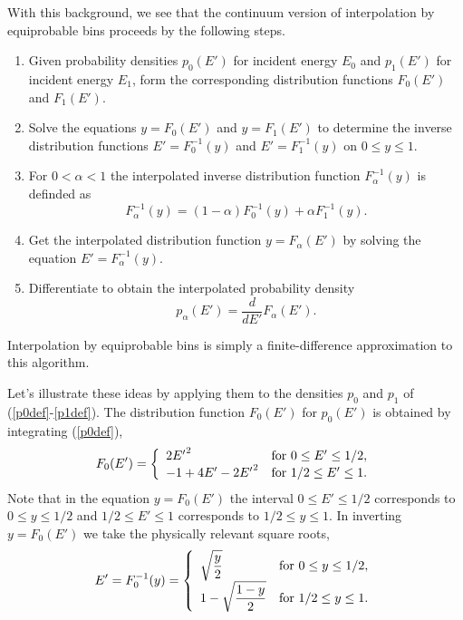 \documentclass[11pt]{article}
\begin{document}
With this background, we see that the continuum version of
interpolation by equiprobable bins proceeds by the following
steps.
\begin{enumerate}
  \item Given probability densities $p_0(E')$ for
     incident energy $E_0$ and $p_1(E')$ for
     incident energy $E_1$, form the corresponding
     distribution functions $F_0(E')$ and $F_1(E')$.
  \item Solve the equations $y = F_0(E')$ and $y = F_1(E')$
     to determine the inverse distribution functions
     $E' = F_0^{-1}(y)$ and $E' = F_1^{-1}(y)$ on $0 \le y \le 1$.
  \item For $0 < \alpha < 1$ the interpolated inverse distribution 
     function $F_\alpha^{-1}(y)$ is definded as
\[
   F_\alpha^{-1}(y) = ( 1 - \alpha ) F_0^{-1}(y) +
    \alpha F_1^{-1}(y).
\]
  \item Get the interpolated distribution function $y = F_\alpha(E')$
    by solving the equation $E' = F_\alpha^{-1}(y)$.
  \item Differentiate to obtain the interpolated probability
    density
\[
    p_\alpha(E') = \frac{d}{dE'} F_\alpha(E').
\]
\end{enumerate}

Interpolation by equiprobable bins is simply a finite-difference
approximation to this algorithm.

Let's illustrate these ideas by applying them to the densities
$p_0$ and $p_1$ of (\ref{p0def}-\ref{p1def}).  The distribution
function $F_0(E')$ for $p_0(E')$ is obtained by integrating
(\ref{p0def}),
\[
  F_0(E') = \left\{
    \begin{array}{ll}
      2{E'}^2 & \hbox{for $0 \le E' \le 1/2$}, \\
      -1 + 4E' -2{E'}^2 & \hbox{for $1/2 \le E' \le 1$}.
    \end{array}
  \right.
\]
Note that in the equation $y = F_0(E')$ the interval
 $0 \le E' \le 1/2$ corresponds to $0  \le y \le 1/2$ and
$1/2 \le E' \le 1$ corresponds to $1/2 \le y \le 1$.
In inverting $y = F_0(E')$ we take the physically
relevant square roots,
\begin{equation}
  E' = F_0^{-1}(y) = \left\{
    \begin{array}{ll}
        {\displaystyle  \sqrt{ \frac{y}{2} } }
          & \hbox{for $0 \le y \le 1/2$}, \\
        {\displaystyle 1 - \sqrt{ \frac{1-y}{2} } }
          & \hbox{for $1/2 \le y \le 1$}.
    \end{array}
  \right.
  \label{F0inverse}
\end{equation}
\end{document}
